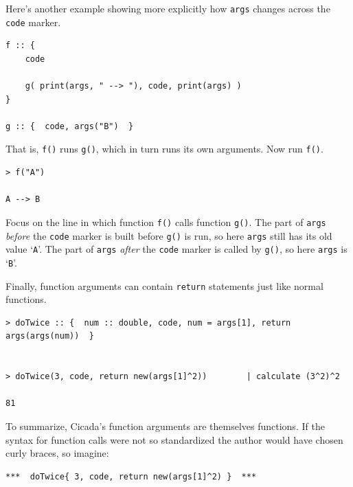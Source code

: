 \documentclass{article}
\newenvironment{code}{
       \begin{list}{}{
               \setlength{\leftmargin}{.4in}
               \setlength{\rightmargin}{0in}
               \setlength{\topsep}{.2in}
       }
       \small
       \item[] }
       { \end{list}   }
\begin{document}
Here's another example showing more explicitly how \texttt{args} changes across the \texttt{code} marker.

\begin{code} \begin{verbatim}
f :: {
    code
    
    g( print(args, " --> "), code, print(args) )
}

g :: {  code, args("B")  }
\end{verbatim} \end{code}

\noindent That is, \texttt{f()} runs \texttt{g()}, which in turn runs its own arguments.  Now run \verb#f()#.

\begin{code} \begin{verbatim}
> f("A")

A --> B
\end{verbatim} \end{code}

\noindent Focus on the line in which function \verb#f()# calls function \verb#g()#.  The part of \verb#args# \emph{before} the \verb#code# marker is built before \verb#g()# is run, so here \texttt{args} still has its old value `\texttt{A}'.  The part of \verb#args# \emph{after} the \verb#code# marker is called by \texttt{g()}, so here \texttt{args} is `\texttt{B}'.

Finally, function arguments can contain \verb#return# statements just like normal functions.

\begin{code} \begin{verbatim}
> doTwice :: {  num :: double, code, num = args[1], return args(args(num))  }


> doTwice(3, code, return new(args[1]^2))        | calculate (3^2)^2

81
\end{verbatim} \end{code}

To summarize, Cicada's function arguments are themselves functions.  If the syntax for function calls were not so standardized the author would have chosen curly braces, so imagine:

\begin{code} \begin{verbatim}
***  doTwice{ 3, code, return new(args[1]^2) }  ***
\end{verbatim} \end{code}
\end{document}
